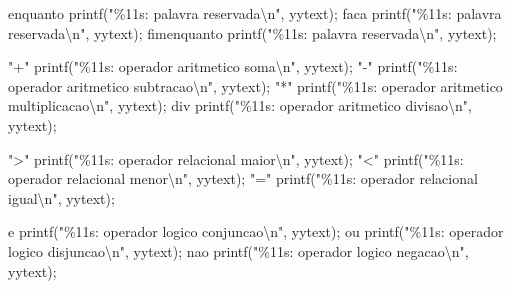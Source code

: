 \documentclass[
  brazilian,
  letterpaper,
]{book}
\newenvironment{Shaded}{\begin{snugshade}}{\end{snugshade}}
\newcommand{\NormalTok}[1]{\textcolor[rgb]{0.00,0.23,0.31}{#1}}
\newcommand{\OperatorTok}[1]{\textcolor[rgb]{0.37,0.37,0.37}{#1}}
\newcommand{\SpecialCharTok}[1]{\textcolor[rgb]{0.37,0.37,0.37}{#1}}
\newcommand{\StringTok}[1]{\textcolor[rgb]{0.13,0.47,0.30}{#1}}
\theoremstyle{plain}
\theoremstyle{definition}
\theoremstyle{remark}
\begin{document}
\begin{Shaded}
\begin{Highlighting}[]
\NormalTok{enquanto    printf}\OperatorTok{(}\StringTok{"}\SpecialCharTok{\%11s}\StringTok{: palavra reservada}\SpecialCharTok{\textbackslash{}n}\StringTok{"}\OperatorTok{,}\NormalTok{ yytext}\OperatorTok{);}
\NormalTok{faca        printf}\OperatorTok{(}\StringTok{"}\SpecialCharTok{\%11s}\StringTok{: palavra reservada}\SpecialCharTok{\textbackslash{}n}\StringTok{"}\OperatorTok{,}\NormalTok{ yytext}\OperatorTok{);}
\NormalTok{fimenquanto printf}\OperatorTok{(}\StringTok{"}\SpecialCharTok{\%11s}\StringTok{: palavra reservada}\SpecialCharTok{\textbackslash{}n}\StringTok{"}\OperatorTok{,}\NormalTok{ yytext}\OperatorTok{);}

\StringTok{"+"}\NormalTok{     printf}\OperatorTok{(}\StringTok{"}\SpecialCharTok{\%11s}\StringTok{: operador aritmetico soma}\SpecialCharTok{\textbackslash{}n}\StringTok{"}\OperatorTok{,}\NormalTok{ yytext}\OperatorTok{);}
\StringTok{"{-}"}\NormalTok{     printf}\OperatorTok{(}\StringTok{"}\SpecialCharTok{\%11s}\StringTok{: operador aritmetico subtracao}\SpecialCharTok{\textbackslash{}n}\StringTok{"}\OperatorTok{,}\NormalTok{ yytext}\OperatorTok{);}
\StringTok{"*"}\NormalTok{     printf}\OperatorTok{(}\StringTok{"}\SpecialCharTok{\%11s}\StringTok{: operador aritmetico multiplicacao}\SpecialCharTok{\textbackslash{}n}\StringTok{"}\OperatorTok{,}\NormalTok{ yytext}\OperatorTok{);}
\NormalTok{div     printf}\OperatorTok{(}\StringTok{"}\SpecialCharTok{\%11s}\StringTok{: operador aritmetico divisao}\SpecialCharTok{\textbackslash{}n}\StringTok{"}\OperatorTok{,}\NormalTok{ yytext}\OperatorTok{);}

\StringTok{"\textgreater{}"}\NormalTok{     printf}\OperatorTok{(}\StringTok{"}\SpecialCharTok{\%11s}\StringTok{: operador relacional maior}\SpecialCharTok{\textbackslash{}n}\StringTok{"}\OperatorTok{,}\NormalTok{ yytext}\OperatorTok{);}
\StringTok{"\textless{}"}\NormalTok{     printf}\OperatorTok{(}\StringTok{"}\SpecialCharTok{\%11s}\StringTok{: operador relacional menor}\SpecialCharTok{\textbackslash{}n}\StringTok{"}\OperatorTok{,}\NormalTok{ yytext}\OperatorTok{);}
\StringTok{"="}\NormalTok{     printf}\OperatorTok{(}\StringTok{"}\SpecialCharTok{\%11s}\StringTok{: operador relacional igual}\SpecialCharTok{\textbackslash{}n}\StringTok{"}\OperatorTok{,}\NormalTok{ yytext}\OperatorTok{);}

\NormalTok{e       printf}\OperatorTok{(}\StringTok{"}\SpecialCharTok{\%11s}\StringTok{: operador logico conjuncao}\SpecialCharTok{\textbackslash{}n}\StringTok{"}\OperatorTok{,}\NormalTok{ yytext}\OperatorTok{);}
\NormalTok{ou      printf}\OperatorTok{(}\StringTok{"}\SpecialCharTok{\%11s}\StringTok{: operador logico disjuncao}\SpecialCharTok{\textbackslash{}n}\StringTok{"}\OperatorTok{,}\NormalTok{ yytext}\OperatorTok{);}
\NormalTok{nao     printf}\OperatorTok{(}\StringTok{"}\SpecialCharTok{\%11s}\StringTok{: operador logico negacao}\SpecialCharTok{\textbackslash{}n}\StringTok{"}\OperatorTok{,}\NormalTok{ yytext}\OperatorTok{);}


\end{Highlighting}
\end{Shaded}
\end{document}
